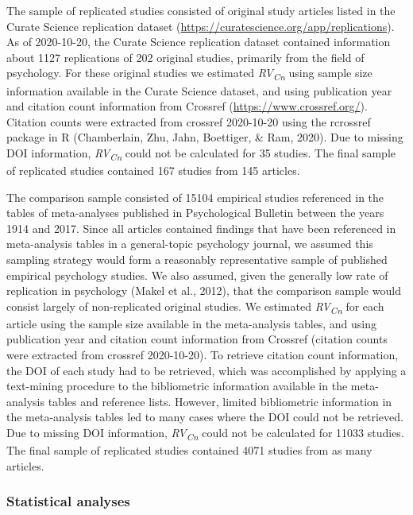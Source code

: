 \documentclass[
  english,
  man,floatsintext]{apa6}
\begin{document}
The sample of replicated studies consisted of original study articles listed in the Curate Science replication dataset (\url{https://curatescience.org/app/replications}). As of 2020-10-20, the Curate Science replication dataset contained information about 1127 replications of 202 original studies, primarily from the field of psychology. For these original studies we estimated \emph{RV\textsubscript{Cn}} using sample size information available in the Curate Science dataset, and using publication year and citation count information from Crossref (\url{https://www.crossref.org/}). Citation counts were extracted from crossref 2020-10-20 using the rcrossref package in R (Chamberlain, Zhu, Jahn, Boettiger, \& Ram, 2020). Due to missing DOI information, \emph{RV\textsubscript{Cn}} could not be calculated for 35 studies. The final sample of replicated studies contained 167 studies from 145 articles.

The comparison sample consisted of 15104 empirical studies referenced in the tables of meta-analyses published in Psychological Bulletin between the years 1914 and 2017. Since all articles contained findings that have been referenced in meta-analysis tables in a general-topic psychology journal, we assumed this sampling strategy would form a reasonably representative sample of published empirical psychology studies. We also assumed, given the generally low rate of replication in psychology (Makel et al., 2012), that the comparison sample would consist largely of non-replicated original studies. We estimated \emph{RV\textsubscript{Cn}} for each article using the sample size available in the meta-analysis tables, and using publication year and citation count information from Crossref (citation counts were extracted from crossref 2020-10-20). To retrieve citation count information, the DOI of each study had to be retrieved, which was accomplished by applying a text-mining procedure to the bibliometric information available in the meta-analysis tables and reference lists. However, limited bibliometric information in the meta-analysis tables led to many cases where the DOI could not be retrieved. Due to missing DOI information, \emph{RV\textsubscript{Cn}} could not be calculated for 11033 studies. The final sample of replicated studies contained 4071 studies from as many articles.\\

\hypertarget{statistical-analyses}{%
\subsubsection{Statistical analyses}\label{statistical-analyses}}
\end{document}

